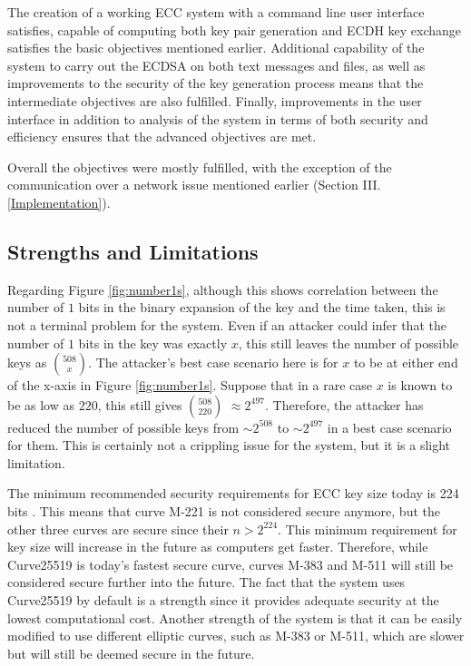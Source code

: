 \documentclass[12pt,a4paper]{article}
\begin{document}
The creation of a working ECC system with a command line user interface satisfies, 
capable of computing both key pair generation and ECDH key exchange satisfies the basic objectives mentioned earlier. 
Additional capability of the system to carry out the ECDSA on both text messages and files, 
as well as improvements to the security of the key generation process means that the intermediate objectives are also fulfilled. 
Finally, improvements in the user interface in addition to analysis of the system in terms of both security and efficiency ensures that the advanced objectives are met. 

Overall the objectives were mostly fulfilled, with the exception of the communication over a network issue mentioned earlier (Section III.\ref{Implementation}). 


\subsection{Strengths and Limitations} \noindent \label{Strengths}
Regarding Figure \ref{fig:number1s}, although this shows correlation between the number of $1$ bits in the binary expansion of the key 
and the time taken, this is not a terminal problem for the system. 
Even if an attacker could infer that the number of $1$ bits in the key was exactly $x$, 
this still leaves the number of possible keys as $508 \choose x$. 
The attacker's best case scenario here is for $x$ to be at either end of the x-axis in Figure \ref{fig:number1s}. 
Suppose that in a rare case $x$ is known to be as low as $220$, this still gives $508 \choose 220$ $\approx 2^{497}$. 
Therefore, the attacker has reduced the number of possible keys from $\sim 2^{508}$ to $\sim 2^{497}$ in a best case scenario for them. 
This is certainly not a crippling issue for the system, but it is a slight limitation. 

The minimum recommended security requirements for ECC key size today is 224 bits \cite[p54-55]{barker2020recommendation}. 
This means that curve M-221 is not considered secure anymore, but the other three curves are secure since their $n > 2^{224}$. 
This minimum requirement for key size will increase in the future as computers get faster. 
Therefore, while Curve25519 is today's fastest secure curve, 
curves M-383 and M-511 will still be considered secure further into the future. 
The fact that the system uses Curve25519 by default is a strength since it provides adequate security at the lowest computational cost. 
Another strength of the system is that it can be easily modified to use different elliptic curves, such as M-383 or M-511, which are slower but will still be deemed secure in the future. 
\end{document}
